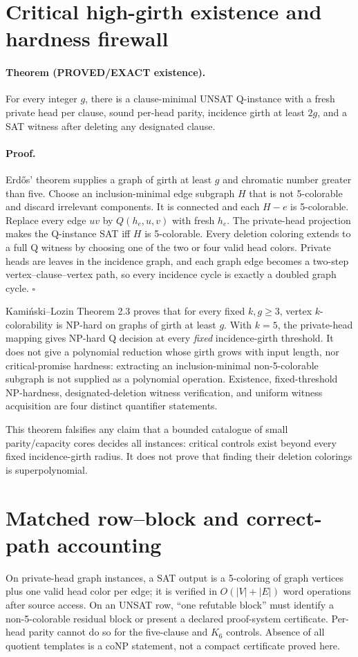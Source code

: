 \documentclass[11pt]{article}
\begin{document}
\section{Critical high-girth existence and hardness firewall}
\paragraph{Theorem (PROVED/EXACT existence).}
For every integer $g$, there is a clause-minimal UNSAT Q-instance with a fresh private head per clause, sound per-head parity, incidence girth at least $2g$, and a SAT witness after deleting any designated clause.

\paragraph{Proof.}
Erd\H{o}s' theorem supplies a graph of girth at least $g$ and chromatic number greater than five.  Choose an inclusion-minimal edge subgraph $H$ that is not 5-colorable and discard irrelevant components.  It is connected and each $H-e$ is 5-colorable.  Replace every edge $uv$ by $Q(h_e,u,v)$ with fresh $h_e$.  The private-head projection makes the Q-instance SAT iff $H$ is 5-colorable.  Every deletion coloring extends to a full Q witness by choosing one of the two or four valid head colors.  Private heads are leaves in the incidence graph, and each graph edge becomes a two-step vertex--clause--vertex path, so every incidence cycle is exactly a doubled graph cycle. \hfill$\square$

Kami\'nski--Lozin Theorem 2.3 proves that for every fixed $k,g\ge3$, vertex $k$-colorability is NP-hard on graphs of girth at least $g$.  With $k=5$, the private-head mapping gives NP-hard Q decision at every \emph{fixed} incidence-girth threshold.  It does not give a polynomial reduction whose girth grows with input length, nor critical-promise hardness: extracting an inclusion-minimal non-5-colorable subgraph is not supplied as a polynomial operation.  Existence, fixed-threshold NP-hardness, designated-deletion witness verification, and uniform witness acquisition are four distinct quantifier statements.

This theorem falsifies any claim that a bounded catalogue of small parity/capacity cores decides all instances: critical controls exist beyond every fixed incidence-girth radius.  It does not prove that finding their deletion colorings is superpolynomial.

\section{Matched row--block and correct-path accounting}
On private-head graph instances, a SAT output is a 5-coloring of graph vertices plus one valid head color per edge; it is verified in $O(|V|+|E|)$ word operations after source access.  On an UNSAT row, ``one refutable block'' must identify a non-5-colorable residual block or present a declared proof-system certificate.  Per-head parity cannot do so for the five-clause and $K_6$ controls.  Absence of all quotient templates is a coNP statement, not a compact certificate proved here.
\end{document}
